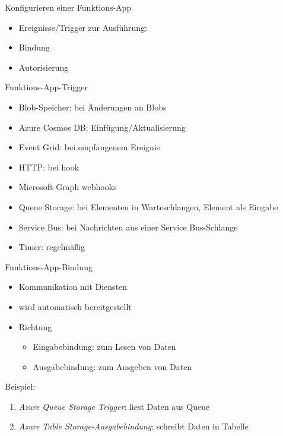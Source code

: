 \begin{flashcard}[Definition]{Konfigurieren einer Funktions-App}
    \begin{itemize}
        \item Ereignisse/Trigger zur Ausführung:
        \item Bindung
        \item Autorisierung
    \end{itemize}
\end{flashcard}

\begin{flashcard}[Definition]{Funktions-App-Trigger}
    \begin{itemize}
        \item Blob-Speicher: bei Änderungen an Blobs
        \item Azure Cosmos DB: Einfügung/Aktualisierung
        \item Event Grid: bei empfangenem Ereignis
        \item HTTP: bei hook
        \item Microsoft-Graph webhooks
        \item Queue Storage: bei Elementen in Warteschlangen, Element als Eingabe
        \item Service Bus: bei Nachrichten aus einer Service Bus-Schlange
        \item Timer: regelmäßig
    \end{itemize}
\end{flashcard}

\begin{flashcard}[Definition]{Funktions-App-Bindung}
    \begin{itemize}
        \item Kommunikation mit Diensten
        \item wird automatisch bereitgestellt
        \item Richtung
        \begin{itemize}
            \item Eingabebindung: zum Lesen von Daten
            \item Ausgabebindung: zum Ausgeben von Daten
        \end{itemize}
    \end{itemize}
    Beispiel:
    \begin{enumerate}
        \item \emph{Azure Queue Storage Trigger}: liest Daten aus Queue
        \item \emph{Azure Table Storage-Ausgabebindung}: schreibt Daten in Tabelle
    \end{enumerate}

\end{flashcard}

